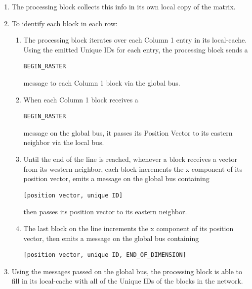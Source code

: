 \begin{enumerate}
      \item The processing block collects this info in its own local copy of the matrix.
      \item To identify each block in each row:
        \begin{enumerate}
          \item The processing block iterates over each Column 1 entry in its local-cache. Using the emitted Unique IDs for each entry, the processing block sends a \begin{verbatim}BEGIN_RASTER\end{verbatim}message to each Column 1 block via the global bus.
          \item When each Column 1 block receives a \begin{verbatim}BEGIN_RASTER\end{verbatim}message on the global bus, it passes its Position Vector to its eastern neighbor via the local bus.
          \item Until the end of the line is reached, whenever a block receives a vector from its western neighbor, each block increments the x component of its position vector, emits a message on the global bus containing \begin{verbatim}[position vector, unique ID]\end{verbatim}then passes its position vector to its eastern neighbor.
          \item The last block on the line increments the x component of its position vector, then emits a message on the global bus containing \begin{verbatim}[position vector, unique ID, END_OF_DIMENSION]\end{verbatim}
        \end{enumerate}
      \item Using the messages passed on the global bus, the processing block is able to fill in its local-cache with all of the Unique IDs of the blocks in the network.
      \end{enumerate}
